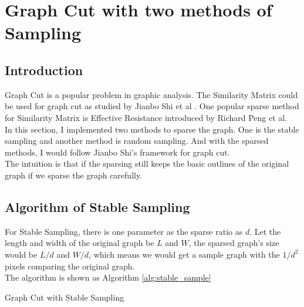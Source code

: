 \newpage
\section{Graph Cut with two methods of Sampling} \label{sec:div}
\subsection{Introduction}
Graph Cut is a popular problem in graphic analysis. The Similarity Matrix could be used for graph cut as studied by Jianbo Shi et al \cite{shi}. One popular sparse method for Similarity Matrix is Effective Resistance introduced by Richard Peng et al\cite{peng}. \\
In this section, I implemented two methods to sparse the graph. One is the stable sampling and another method is random sampling.  And with the sparsed methods, I would follow Jianbo Shi's framework\cite{shi} for graph cut. \\
The intuition is that if the sparsing still keeps the basic outlines of the original graph if we sparse the graph carefully. \\

\subsection{Algorithm of Stable Sampling}
For Stable Sampling, there is one parameter as the sparse ratio as $d$. Let the length and width of the original graph be $L$ and $W$, the sparsed graph's size would be $L/d$ and $W/d$, which means we would get a sample graph with the $1/d^2$ pixels comparing the original graph. \\
The algorithm is shown as Algorithm \ref{alg:stable_sample}
\begin{algorithm}[h!]                      %
\caption{Graph Cut with Stable Sampling}          %
\label{alg:stable_sample}                           %
\begin{algorithmic} [1]                   %
   \EndFor
 \EndFor
   \EndFor
 \EndFor
 \State {}
\end{algorithmic}
\end{algorithm}


